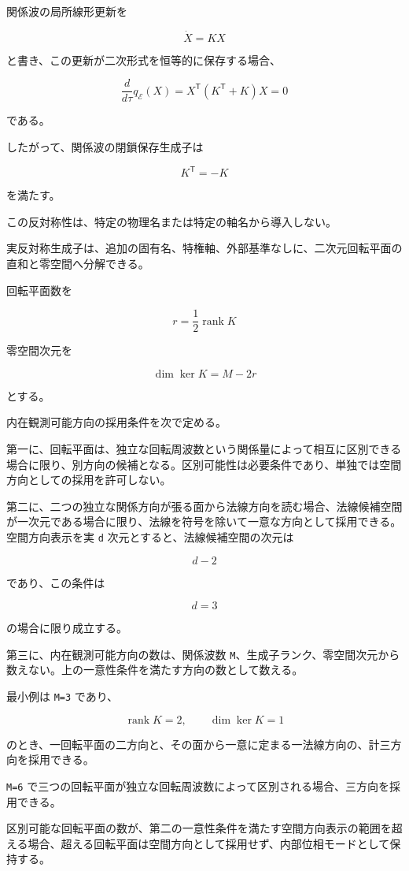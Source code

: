 \documentclass[
  a4paper,
]{ltjsarticle}
\begin{document}
関係波の局所線形更新を

\[
\dot X=KX
\]

と書き、この更新が二次形式を恒等的に保存する場合、

\[
\frac{d}{d\tau}q_{\mathcal E}(X)
=X^{\mathsf T}\left(K^{\mathsf T}+K\right)X
=0
\]

である。

したがって、関係波の閉鎖保存生成子は

\[
K^{\mathsf T}=-K
\]

を満たす。

この反対称性は、特定の物理名または特定の軸名から導入しない。

実反対称生成子は、追加の固有名、特権軸、外部基準なしに、二次元回転平面の直和と零空間へ分解できる。

回転平面数を

\[
r=\frac12\operatorname{rank}K
\]

零空間次元を

\[
\dim\ker K=M-2r
\]

とする。

内在観測可能方向の採用条件を次で定める。

第一に、回転平面は、独立な回転周波数という関係量によって相互に区別できる場合に限り、別方向の候補となる。区別可能性は必要条件であり、単独では空間方向としての採用を許可しない。

第二に、二つの独立な関係方向が張る面から法線方向を読む場合、法線候補空間が一次元である場合に限り、法線を符号を除いて一意な方向として採用できる。空間方向表示を実
\texttt{d} 次元とすると、法線候補空間の次元は

\[
d-2
\]

であり、この条件は

\[
d=3
\]

の場合に限り成立する。

第三に、内在観測可能方向の数は、関係波数
\texttt{M}、生成子ランク、零空間次元から数えない。上の一意性条件を満たす方向の数として数える。

最小例は \texttt{M=3} であり、

\[
\operatorname{rank}K=2,
\qquad
\dim\ker K=1
\]

のとき、一回転平面の二方向と、その面から一意に定まる一法線方向の、計三方向を採用できる。

\texttt{M=6}
で三つの回転平面が独立な回転周波数によって区別される場合、三方向を採用できる。

区別可能な回転平面の数が、第二の一意性条件を満たす空間方向表示の範囲を超える場合、超える回転平面は空間方向として採用せず、内部位相モードとして保持する。
\end{document}
